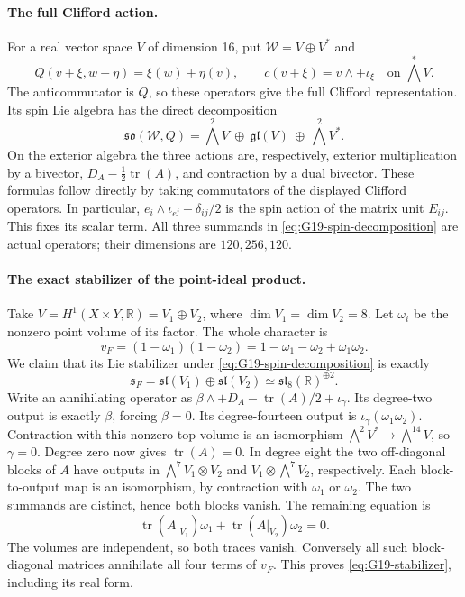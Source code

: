 \paragraph{The full Clifford action.}
For a real vector space \(V\) of dimension 16, put
\(\mathcal W=V\oplus V^*\) and
\[
 Q(v+\xi,w+\eta)=\xi(w)+\eta(v),\qquad
 c(v+\xi)=v\wedge+\iota_\xi\quad\text{on }\bigwedge^*V.
\]
The anticommutator is \(Q\), so these operators give the full
Clifford representation. Its spin Lie algebra has the direct decomposition
\begin{equation}\label{eq:G19-spin-decomposition}
 \mathfrak{so}(\mathcal W,Q)
 =\bigwedge^2V\ \oplus\ \mathfrak{gl}(V)\ \oplus\ \bigwedge^2V^*.
\end{equation}
On the exterior algebra the three actions are, respectively, exterior
multiplication by a bivector, \(D_A-\tfrac12\operatorname{tr}(A)\),
and contraction by a dual bivector. These formulas follow directly by
taking commutators of the displayed Clifford operators. In particular,
\(e_i\wedge\iota_{e^j}-\delta_{ij}/2\) is the spin action of
the matrix unit \(E_{ij}\). This fixes its scalar term.
All three summands in \eqref{eq:G19-spin-decomposition} are actual
operators; their dimensions are \(120,256,120\).

\paragraph{The exact stabilizer of the point-ideal product.}
Take \(V=H^1(X\times Y,\mathbb R)=V_1\oplus V_2\), where
\(\dim V_1=\dim V_2=8\). Let \(\omega_i\) be the nonzero
point volume of its factor. The whole character is
\[
 v_F=(1-\omega_1)(1-\omega_2)
     =1-\omega_1-\omega_2+\omega_1\omega_2.
\]
We claim that its Lie stabilizer under
\eqref{eq:G19-spin-decomposition} is exactly
\begin{equation}\label{eq:G19-stabilizer}
 \mathfrak s_F=\mathfrak{sl}(V_1)\oplus\mathfrak{sl}(V_2)
              \simeq\mathfrak{sl}_8(\mathbb R)^{\oplus2}.
\end{equation}
Write an annihilating operator as
\(\beta\wedge+D_A-\operatorname{tr}(A)/2+\iota_\gamma\).
Its degree-two output is exactly \(\beta\), forcing \(\beta=0\).
Its degree-fourteen output is
\(\iota_\gamma(\omega_1\omega_2)\). Contraction with this
nonzero top volume is an isomorphism
\(\bigwedge^2V^*\to\bigwedge^{14}V\), so \(\gamma=0\).
Degree zero now gives \(\operatorname{tr}(A)=0\).
In degree eight the two off-diagonal blocks of \(A\) have outputs in
\(\bigwedge^7V_1\otimes V_2\) and
\(V_1\otimes\bigwedge^7V_2\), respectively. Each block-to-output
map is an isomorphism, by contraction with \(\omega_1\) or
\(\omega_2\). The two summands are distinct, hence both blocks vanish.
The remaining equation is
\[
 \operatorname{tr}(A|_{V_1})\omega_1+
 \operatorname{tr}(A|_{V_2})\omega_2=0.
\]
The volumes are independent, so both traces vanish. Conversely all such
block-diagonal matrices annihilate all four terms of \(v_F\).
This proves \eqref{eq:G19-stabilizer}, including its real form.

